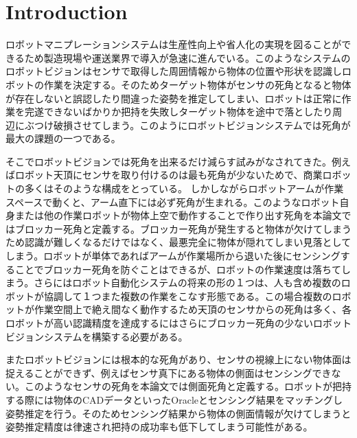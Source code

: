 \documentclass[xelatex,ja=standard]{bxjsarticle}
\begin{document}
\section{Introduction}
ロボットマニプレーションシステムは生産性向上や省人化の実現を図ることができるため製造現場や運送業界で導入が急速に進んでいる。このようなシステムのロボットビジョンはセンサで取得した周囲情報から物体の位置や形状を認識しロボットの作業を決定する。そのためターゲット物体がセンサの死角となると物体が存在しないと誤認したり間違った姿勢を推定してしまい、ロボットは正常に作業を完遂できないばかりか把持を失敗しターゲット物体を途中で落としたり周辺にぶつけ破損させてしまう。このようにロボットビジョンシステムでは死角が最大の課題の一つである。

そこでロボットビジョンでは死角を出来るだけ減らす試みがなされてきた。例えばロボット天頂にセンサを取り付けるのは最も死角が少ないためで、商業ロボットの多くはそのような構成をとっている\cite{mujin}\cite{toshiba}\cite{righthand}。
しかしながらロボットアームが作業スペースで動くと、アーム直下には必ず死角が生まれる。このようなロボット自身または他の作業ロボットが物体上空で動作することで作り出す死角を本論文ではブロッカー死角と定義する。ブロッカー死角が発生すると物体が欠けてしまうため認識が難しくなるだけではなく、最悪完全に物体が隠れてしまい見落としてしまう。ロボットが単体であればアームが作業場所から退いた後にセンシングすることでブロッカー死角を防ぐことはできるが、ロボットの作業速度は落ちてしまう。さらにはロボット自動化システムの将来の形の１つは、人も含め複数のロボットが協調して１つまた複数の作業をこなす形態である。この場合複数のロボットが作業空間上で絶え間なく動作するため天頂のセンサからの死角は多く、各ロボットが高い認識精度を達成するにはさらにブロッカー死角の少ないロボットビジョンシステムを構築する必要がある。

またロボットビジョンには根本的な死角があり、センサの視線上にない物体面は捉えることができず、例えばセンサ真下にある物体の側面はセンシングできない。このようなセンサの死角を本論文では側面死角と定義する。ロボットが把持する際には物体のCADデータといったOracleとセンシング結果をマッチングし姿勢推定を行う。そのためセンシング結果から物体の側面情報が欠けてしまうと姿勢推定精度は律速され把持の成功率も低下してしまう可能性がある。
\end{document}
